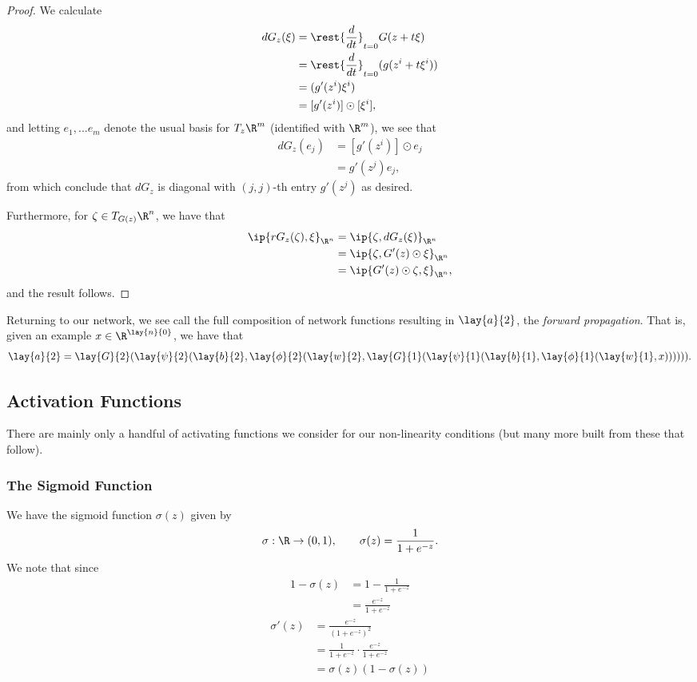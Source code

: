 \begin{proof}
	We calculate
	\begin{align*}
		dG_z(\xi)&=\rest{\frac{d}{dt}}_{t=0}G(z+t\xi)\\
		&=\rest{\frac{d}{dt}}_{t=0}(g(z^i+t\xi^i))\\
		&=(g'(z^i)\xi^i)\\
		&=[g'(z^i)]\odot[\xi^i],
	\end{align*}
	and letting $e_1,...e_m$ denote the usual basis for $T_z\R^m$ (identified with $\R^m$), we see that
	\begin{align*}
		dG_z(e_j)&=[g'(z^i)]\odot e_j\\
		&=g'(z^j)e_j,
	\end{align*}
	from which conclude that $dG_z$ is diagonal with $(j,j)$-th entry $g'(z^j)$ as desired.
	
	Furthermore, for $\zeta\in T_{G(z)}\R^n$, we have that
	\begin{align*}
		\ip{rG_z(\zeta),\xi}_{\R^n}&=\ip{\zeta,dG_z(\xi)}_{\R^n}\\
		&=\ip{\zeta,G'(z)\odot\xi}_{\R^n}\\
		&=\ip{G'(z)\odot\zeta,\xi}_{\R^n},
	\end{align*}
	and the result follows.
\end{proof}

Returning to our network, we see call the full composition of network functions resulting in $\lay{a}{2}$, the \textit{forward propagation}.  That is, given an example $x\in\R^{\lay{n}{0}}$, we have that
$$\lay{a}{2}=\lay{G}{2}(\lay{\psi}{2}(\lay{b}{2},\lay{\phi}{2}(\lay{w}{2},\lay{G}{1}(\lay{\psi}{1}(\lay{b}{1},\lay{\phi}{1}(\lay{w}{1},x)))))).$$



\subsection{Activation Functions}
There are mainly only a handful of activating functions we consider for our non-linearity conditions (but many more built from these that follow).

\subsubsection{The Sigmoid Function}
We have the sigmoid function $\sigma(z)$ given by
$$\sigma:\R\to(0,1),\qquad \sigma(z)=\frac{1}{1+e^{-z}}.$$
We note that since
\begin{align*}
	1-\sigma(z)&=1-\frac{1}{1+e^{-z}}\\
	&=\frac{e^{-z}}{1+e^{-z}}
\end{align*}
\begin{align*}
	\sigma'(z)&=\frac{e^{-z}}{(1+e^{-z})^2}\\
	&=\frac{1}{1+e^{-z}}\cdot\frac{e^{-z}}{1+e^{-z}}\\
	&=\sigma(z)(1-\sigma(z))
\end{align*}



